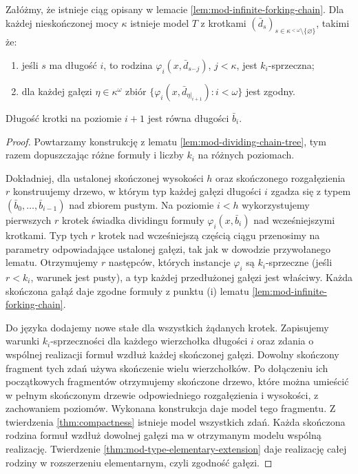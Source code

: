 \begin{lemat}
\label{lem:mod-varying-formula-tree}
Załóżmy, że istnieje ciąg opisany
w lemacie \ref{lem:mod-infinite-forking-chain}.
Dla każdej nieskończonej mocy $\kappa$
istnieje model $T$ z krotkami
$(\bar d_s)_{s\in\kappa^{<\omega}
\setminus\{\varnothing\}}$,
takimi że:
\begin{enumerate}[label=(\roman*)]
\item jeśli $s$ ma długość $i$, to rodzina
$\varphi_i(x,\bar d_{s^\frown j})$,
$j<\kappa$, jest $k_i$-sprzeczna;
\item dla każdej gałęzi $\eta\in\kappa^\omega$
zbiór
$\{\varphi_i(x,\bar d_{\eta|_{i+1}}):i<\omega\}$
jest zgodny.
\end{enumerate}
Długość krotki na poziomie $i+1$
jest równa długości $\bar b_i$.
\end{lemat}
\begin{proof}
Powtarzamy konstrukcję z lematu
\ref{lem:mod-dividing-chain-tree},
tym razem dopuszczając różne formuły
i liczby $k_i$ na różnych poziomach.

Dokładniej, dla ustalonej skończonej
wysokości $h$ oraz skończonego rozgałęzienia
$r$ konstruujemy drzewo, w którym typ
każdej gałęzi długości $i$ zgadza się
z typem $(\bar b_0,\ldots,\bar b_{i-1})$
nad zbiorem pustym.
Na poziomie $i<h$ wykorzystujemy
pierwszych $r$ krotek świadka dividingu
formuły $\varphi_i(x,\bar b_i)$
nad wcześniejszymi krotkami.
Typ tych $r$ krotek nad wcześniejszą
częścią ciągu przenosimy na parametry
odpowiadające ustalonej gałęzi,
tak jak w dowodzie przywołanego lematu.
Otrzymujemy $r$ następców, których
instancje $\varphi_i$ są $k_i$-sprzeczne
(jeśli $r<k_i$, warunek jest pusty),
a typ każdej przedłużonej gałęzi
jest właściwy. Każda skończona gałąź
daje zgodne formuły z punktu (i)
lematu \ref{lem:mod-infinite-forking-chain}.

Do języka dodajemy nowe stałe
dla wszystkich żądanych krotek.
Zapisujemy warunki $k_i$-sprzeczności
dla każdego wierzchołka długości $i$
oraz zdania o wspólnej realizacji
formuł wzdłuż każdej skończonej gałęzi.
Dowolny skończony fragment tych zdań
używa skończenie wielu wierzchołków.
Po dołączeniu ich początkowych
fragmentów otrzymujemy skończone
drzewo, które można umieścić
w pełnym skończonym drzewie
odpowiedniego rozgałęzienia i wysokości,
z zachowaniem poziomów.
Wykonana konstrukcja daje model
tego fragmentu.
Z twierdzenia \ref{thm:compactness}
istnieje model wszystkich zdań.
Każda skończona rodzina formuł wzdłuż
dowolnej gałęzi ma w otrzymanym modelu
wspólną realizację. Twierdzenie
\ref{thm:mod-type-elementary-extension}
daje realizację całej rodziny w rozszerzeniu
elementarnym, czyli zgodność gałęzi.
\end{proof}

